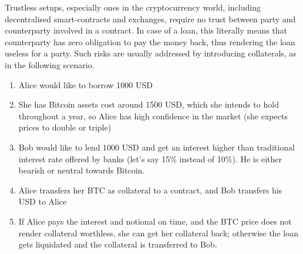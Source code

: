 \documentclass[runningheads]{llncs}
\begin{document}
Trustless setups, especially ones in the cryptocurrency world, including 
decentralised smart-contracts and exchanges, require no trust between
party and counterparty involved in a contract. In case of a loan,
this literally means that counterparty has zero obligation to pay
the money back, thus rendering the loan useless for a party. Such
risks are usually addressed by introducing collaterals, as in the following scenario. 
\begin{enumerate}
\item Alice would like to borrow 1000 USD 
\item She has Bitcoin assets cost around 1500 USD, which she intends to
hold throughout a year, so Alice has high confidence in the market
(she expects prices to double or triple) 
\item Bob would like to lend 1000 USD and get an interest higher than traditional
interest rate offered by banks (let's say 15\% instead of 10\%). He
is either bearish or neutral towards Bitcoin. 
\item Alice transfers her BTC as collateral to a contract, and Bob transfers
his USD to Alice 
\item If Alice pays the interest and notional on time, and the BTC price does not
render collateral worthless, she can get her collateral back; otherwise
the loan gets liquidated and the collateral is transferred to Bob. 
\end{enumerate}

\end{document}
